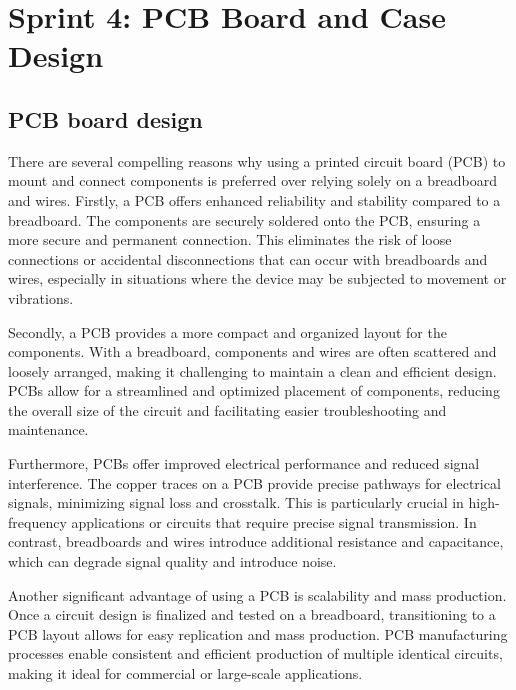 %
%


\chapter{Sprint 4: PCB Board and Case Design}
\section{ PCB board  design}
There are several compelling reasons why using a printed circuit board (PCB) to mount and connect components is preferred over relying solely on a breadboard and wires. Firstly, a PCB offers enhanced reliability and stability compared to a breadboard. The components are securely soldered onto the PCB, ensuring a more secure and permanent connection. This eliminates the risk of loose connections or accidental disconnections that can occur with breadboards and wires, especially in situations where the device may be subjected to movement or vibrations.

Secondly, a PCB provides a more compact and organized layout for the components. With a breadboard, components and wires are often scattered and loosely arranged, making it challenging to maintain a clean and efficient design. PCBs allow for a streamlined and optimized placement of components, reducing the overall size of the circuit and facilitating easier troubleshooting and maintenance.

Furthermore, PCBs offer improved electrical performance and reduced signal interference. The copper traces on a PCB provide precise pathways for electrical signals, minimizing signal loss and crosstalk. This is particularly crucial in high-frequency applications or circuits that require precise signal transmission. In contrast, breadboards and wires introduce additional resistance and capacitance, which can degrade signal quality and introduce noise.

Another significant advantage of using a PCB is scalability and mass production. Once a circuit design is finalized and tested on a breadboard, transitioning to a PCB layout allows for easy replication and mass production. PCB manufacturing processes enable consistent and efficient production of multiple identical circuits, making it ideal for commercial or large-scale applications.


